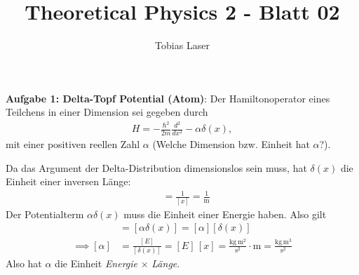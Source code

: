 \documentclass[11pt,a4paper]{scrartcl}
\begin{document}
%
\title{Theoretical Physics 2 - Blatt 02}
\author{Tobias Laser}
\maketitle
\vfill
\thispagestyle{empty}
%
%
\thispagestyle{empty}
%
%
\textbf{Aufgabe 1: Delta-Topf Potential (Atom)}: Der Hamiltonoperator eines Teilchens in einer Dimension sei gegeben durch 
\begin{align*}
    H=-\frac{\hbar^2}{2m}\frac{d^2}{dx^2}-\alpha \delta(x),
\end{align*}
mit einer positiven reellen Zahl $\alpha$ (Welche Dimension bzw. Einheit hat $\alpha$?).
\begin{tcolorbox}[title=Berechnung, breakable]
    Da das Argument der Delta-Distribution dimensionslos sein muss, hat $\delta(x)$ die Einheit einer inversen Länge:
    \begin{align*}
        [\delta(x)] &= \frac{1}{[x]} = \frac{1}{\mathrm{m}}
    \end{align*}
    Der Potentialterm $\alpha\delta(x)$ muss die Einheit einer Energie haben. Also gilt
    \begin{align*}
        [E] &= [\alpha \delta(x)] = [\alpha][\delta(x)]\\
        \implies [\alpha] &= \frac{[E]}{[\delta(x)]}
        = [E]\,[x]
        = \frac{\mathrm{kg}\,\mathrm{m}^2}{\mathrm{s}^2}\cdot \mathrm{m}
        = \frac{\mathrm{kg}\,\mathrm{m}^3}{\mathrm{s}^2}
    \end{align*}
    Also hat $\alpha$ die Einheit \emph{Energie} $\times$ \emph{Länge}.
\end{tcolorbox}
\end{document}

